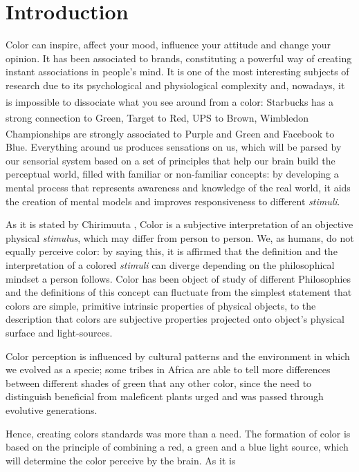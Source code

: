 \documentclass{report}
\begin{document}
\chapter{Introduction}
%
Color can inspire, affect your mood, influence your attitude and change your opinion. It has been associated
to brands, constituting a powerful way of creating instant
associations in people’s mind. It is one of the most interesting subjects of research due to its psychological
and physiological complexity and, nowadays, it is impossible to dissociate what you see around
from a color: Starbucks\textsuperscript{\textregistered} has a strong connection to Green,
Target\textsuperscript{\textregistered} to Red, UPS\textsuperscript{\textregistered} to Brown, Wimbledon
Championships\textsuperscript{\textregistered} are strongly associated to Purple and Green and Facebook\textsuperscript{\textregistered} to Blue.
Everything around us produces sensations on us, which will be parsed by our sensorial system based on a set
of principles that help our brain build the perceptual world, filled with familiar or non-familiar concepts:
by developing a mental process that represents awareness and knowledge of the real world, it aids the creation
of mental models and improves responsiveness to different \emph{stimuli}. \par
As it is stated by Chirimuuta \cite{Chirimuuta2014}, Color is a subjective interpretation of an objective physical \emph{stimulus}, which
may differ from person to person. We, as humans, do not equally perceive color: by saying this, it is affirmed
that the definition and the interpretation of a colored \emph{stimuli} can diverge depending on the philosophical mindset
a person follows. Color has been object of study of different Philosophies and the definitions of this concept
can fluctuate from the simplest statement that colors are simple, primitive intrinsic properties of physical objects,
to the description that colors are subjective properties projected onto object’s physical surface and light-sources. \par
Color perception is influenced by cultural patterns and the environment in which we evolved as a
specie; some tribes in Africa are able to tell more differences between different shades of green that any other
color, since the need to distinguish beneficial from maleficent plants urged and was passed through evolutive generations. \par
Hence, creating colors standards was more than a need. The formation of color is based on the principle of
combining a red, a green and a blue light source, which will determine the color perceive by the brain. As it is
\end{document}
